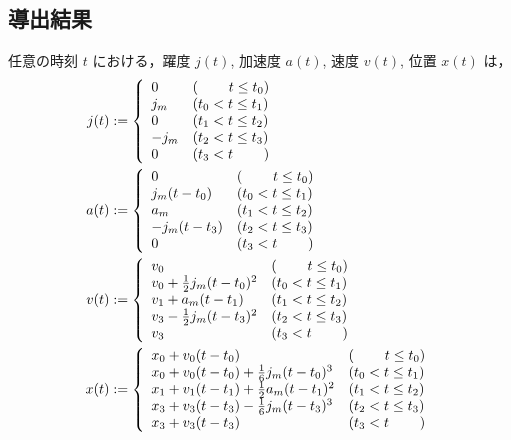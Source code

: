 \documentclass[a5paper]{ltjsarticle}
\begin{document}
\subsection{導出結果}
任意の時刻 $t$ における，躍度 $j(t)$, 加速度 $a(t)$, 速度 $v(t)$, 位置 $x(t)$
は，
\begin{align}
    j(t)
     & :=
    \left\{ \begin{array}{ll}
        0    & (\hspace{2.2em}t \le t_0) \\
        j_m  & (t_0 < t \le t_1)         \\
        0    & (t_1 < t \le t_2)         \\
        -j_m & (t_2 < t \le t_3)         \\
        0    & (t_3 < t \hspace{2.2em})
    \end{array} \right.
    \\
    a(t)
     & :=
    \left\{ \begin{array}{ll}
        0           & (\hspace{2.2em}t \le t_0) \\
        j_m(t-t_0)  & (t_0 < t \le t_1)         \\
        a_m         & (t_1 < t \le t_2)         \\
        -j_m(t-t_3) & (t_2 < t \le t_3)         \\
        0           & (t_3 < t \hspace{2.2em})
    \end{array} \right.
    \\
    v(t)
     & :=
    \left\{ \begin{array}{ll}
        v_0                           & (\hspace{2.2em} t \le t_0) \\
        v_0 + \frac{1}{2}j_m(t-t_0)^2 & (t_0 < t \le t_1)          \\
        v_1 + a_m(t-t_1)              & (t_1 < t \le t_2)          \\
        v_3 - \frac{1}{2}j_m(t-t_3)^2 & (t_2 < t \le t_3)          \\
        v_3                           & (t_3 < t \hspace{2.2em})
    \end{array} \right.
    \\
    x(t)
     & :=
    \left\{ \begin{array}{ll}
        x_0 + v_0(t-t_0)                           & (\hspace{2.2em} t \le t_0) \\
        x_0 + v_0(t-t_0) + \frac{1}{6}j_m(t-t_0)^3 & (t_0 < t \le t_1)          \\
        x_1 + v_1(t-t_1) + \frac{1}{2}a_m(t-t_1)^2 & (t_1 < t \le t_2)          \\
        x_3 + v_3(t-t_3) - \frac{1}{6}j_m(t-t_3)^3 & (t_2 < t \le t_3)          \\
        x_3 + v_3(t-t_3)                           & (t_3 < t \hspace{2.2em})
    \end{array} \right.
\end{align}
\end{document}

